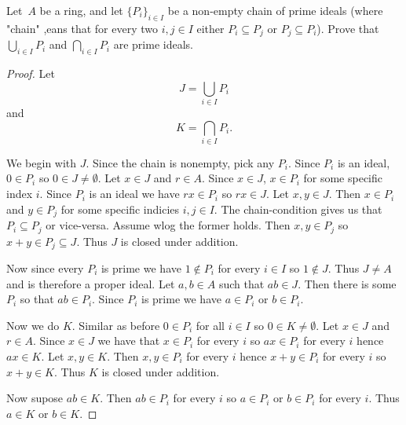 \documentclass[11pt]{article}
\begin{document}
\begin{prob}
    Let $A$ be a ring, and let $\{P_i\}_{i\in I}$ be a 
    non-empty chain of prime ideals (where "chain" ,eans 
    that for every two $i,j \in I$ either $P_i \subseteq P_j$ 
    or $P_j \subseteq P_i$). Prove that 
    $\bigcup_{i\in I}P_i$ and $\bigcap_{i\in I}P_i$
    are prime ideals. 
\end{prob}
\begin{proof}
    Let 
    \[
        J = \bigcup_{i \in I} P_i
    \]
    and 
    \[
        K = \bigcap_{i \in I} P_i.
    \]

    We begin with $J$. 
    Since the chain is nonempty, pick any $P_i$. Since 
    $P_i$ is an ideal, $0 \in P_i$ so $0 \in J \neq \emptyset$. 
    Let $x \in J$ and $r \in A$. Since $x \in J$, 
    $x \in P_i$ for some specific index $i$. Since $P_i$ is 
    an ideal we have $rx \in P_i$ so $rx \in J$. 
    Let $x,y \in J$. Then $x \in P_i$ and $y \in P_j$ for 
    some specific indicies $i,j\in I$. The chain-condition 
    gives us that $P_i \subseteq P_j$ or vice-versa. Assume 
    wlog the former holds. Then 
    $x,y \in P_j$ so $x+y \in P_j \subseteq J$. Thus 
    $J$ is closed under addition. 

    Now since every $P_i$ is prime we have $1 \not\in P_i$ for 
    every $i \in I$ so $1 \not \in J$. Thus $J \neq A$ and is 
    therefore a proper ideal. Let $a,b \in A$ such 
    that $ab \in J$. Then there is some $P_i$ so that 
    $ab \in P_i$. Since $P_i$ is prime we have 
    $a \in P_i$ or $b \in P_i$. 

    Now we do $K$. 
    Similar as before $0 \in P_i$ for all $i \in I$ so 
    $0 \in K \neq \emptyset$. 
    Let $x \in J$ and $r \in A$. Since $x \in J$ we have that 
    $x \in P_i$ for every $i$ so $ax \in P_i$ for every 
    $i$ hence $ax \in K$. Let $x,y \in K$. Then 
    $x,y \in P_i$ for every $i$ hence 
    $x +y \in P_i$ for every $i$ so $x+ y \in K$. 
    Thus $K$ is closed under addition. 

    Now supose $ab \in K$. Then $ab \in P_i$ for every 
    $i$ so $a \in P_i$ or $b \in P_i$ for every $i$. 
    Thus $a \in K$ or $b \in K$. 
\end{proof}
\end{document}
